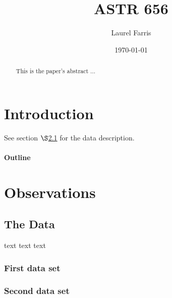 \documentclass[12pt]{article}
\title{ASTR 656}
\author{Laurel Farris}
\date{\today}
\begin{document}

\maketitle

\begin{abstract}
This is the paper's abstract $\ldots$
\end{abstract}


\section{Introduction}
See section $\S$\ref{data} for the data description.
\paragraph{Outline}
\section{Observations}
  \subsection{The Data}\label{data}
  text text text
  \subsubsection{First data set}
  \subsubsection{Second data set}
\end{document}
